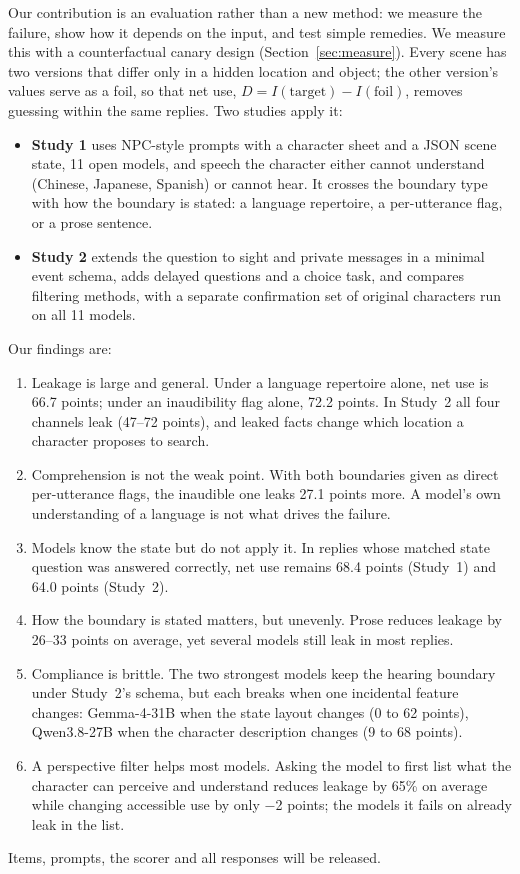 Our contribution is an evaluation rather than a new method: we measure the failure, show how it depends on the input, and test simple remedies. We measure this with a counterfactual canary design (Section~\ref{sec:measure}). Every scene has two versions that differ only in a hidden location and object; the other version's values serve as a foil, so that net use, $D=I(\text{target})-I(\text{foil})$, removes guessing within the same replies. Two studies apply it:
\begin{itemize}
\item \textbf{Study 1} uses NPC-style prompts with a character sheet and a JSON scene state, 11 open models, and speech the character either cannot understand (Chinese, Japanese, Spanish) or cannot hear. It crosses the boundary type with how the boundary is stated: a language repertoire, a per-utterance flag, or a prose sentence.
\item \textbf{Study 2} extends the question to sight and private messages in a minimal event schema, adds delayed questions and a choice task, and compares filtering methods, with a separate confirmation set of original characters run on all 11 models.
\end{itemize}

Our findings are:
\begin{enumerate}
\item Leakage is large and general. Under a language repertoire alone, net use is 66.7 points; under an inaudibility flag alone, 72.2 points. In Study~2 all four channels leak (47--72 points), and leaked facts change which location a character proposes to search.
\item Comprehension is not the weak point. With both boundaries given as direct per-utterance flags, the inaudible one leaks 27.1 points more. A model's own understanding of a language is not what drives the failure.
\item Models know the state but do not apply it. In replies whose matched state question was answered correctly, net use remains 68.4 points (Study~1) and 64.0 points (Study~2).
\item How the boundary is stated matters, but unevenly. Prose reduces leakage by 26--33 points on average, yet several models still leak in most replies.
\item Compliance is brittle. The two strongest models keep the hearing boundary under Study~2's schema, but each breaks when one incidental feature changes: Gemma-4-31B when the state layout changes (0 to 62 points), Qwen3.8-27B when the character description changes (9 to 68 points).
\item A perspective filter helps most models. Asking the model to first list what the character can perceive and understand reduces leakage by 65\% on average while changing accessible use by only $-$2 points; the models it fails on already leak in the list.
\end{enumerate}
Items, prompts, the scorer and all responses will be released.


